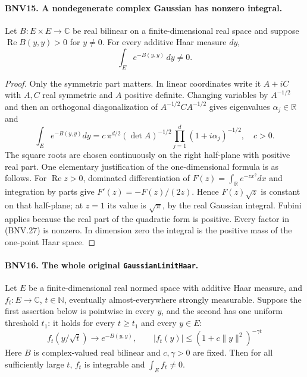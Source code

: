 \documentclass[11pt,a4paper]{article}
\numberwithin{equation}{section}
\theoremstyle{remark}\newtheorem{remark}[theorem]{Remark}
\begin{document}
\paragraph{BNV15. A nondegenerate complex Gaussian has nonzero integral.}
\label{claim:BNV15}
Let $B:E\times E\to\mathbb C$ be real bilinear on a finite-dimensional
real space and suppose $\operatorname{Re}B(y,y)>0$ for $y\ne0$.
For every additive Haar measure $dy$,
\[
 \int_E e^{-B(y,y)}\,dy\ne0.
 \tag{BNV.26}
\]

\begin{proof}
Only the symmetric part matters.  In linear coordinates write it
$A+iC$ with $A,C$ real symmetric and $A$ positive definite.
Changing variables by $A^{-1/2}$ and then an orthogonal diagonalization
of $A^{-1/2}CA^{-1/2}$ gives eigenvalues $\alpha_j\in\mathbb R$ and
\[
 \int_E e^{-B(y,y)}dy
   =c\,\pi^{d/2}(\det A)^{-1/2}
           \prod_{j=1}^{d}(1+i\alpha_j)^{-1/2},\quad c>0.
 \tag{BNV.27}
\]
The square roots are chosen continuously on the right half-plane with
positive real part.  One elementary justification of the one-dimensional
formula is as follows.  For $\operatorname{Re}z>0$, dominated
differentiation of $F(z)=\int_{\mathbb R}e^{-zx^2}dx$ and integration
by parts give $F'(z)=-F(z)/(2z)$.  Hence $F(z)\sqrt z$ is constant
on that half-plane; at $z=1$ its value is $\sqrt\pi$, by the real
Gaussian integral.  Fubini applies because the real part of the quadratic
form is positive.  Every factor in (BNV.27) is nonzero.  In dimension
zero the integral is the positive mass of the one-point Haar space.
\end{proof}

\paragraph{BNV16. The whole original \texttt{Gaussian\allowbreak Limit\allowbreak Haar}.}
\label{claim:BNV16}
Let $E$ be a finite-dimensional real normed space with additive Haar
measure, and $f_t:E\to\mathbb C$, $t\in\mathbb N$, eventually
almost-everywhere strongly measurable.
Suppose the first assertion below is pointwise in every $y$, and the
second has one uniform threshold $t_1$: it holds for every $t\ge t_1$
and every $y\in E$:
\[
 f_t(y/\sqrt t)\longrightarrow e^{-B(y,y)},
 \qquad |f_t(y)|\le(1+c\|y\|^2)^{-\gamma t}
 \tag{BNV.28}
\]
Here $B$ is complex-valued real bilinear and $c,\gamma>0$ are fixed.
Then for all sufficiently large $t$, $f_t$ is integrable and
$\int_E f_t\ne0$.
\end{document}
